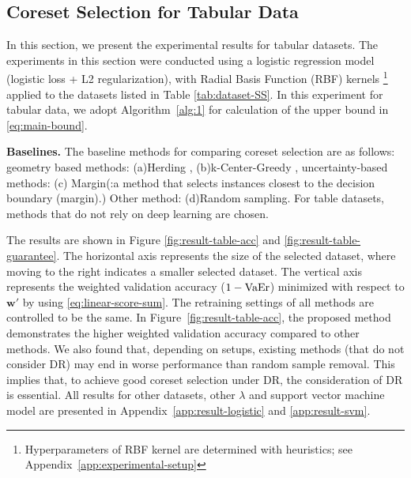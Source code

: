	\subsection{Coreset Selection for Tabular Data}
	\label{subsec:result-table}

	In this section, we present the experimental results for tabular datasets.
	The experiments in this section were conducted using a logistic regression model (logistic loss + L2 regularization), with Radial Basis Function (RBF) kernels
	\footnote{Hyperparameters of RBF kernel are determined with heuristics; see Appendix~\ref{app:experimental-setup}} \citep{scholkopf2001generalized} applied to the datasets listed in Table \ref{tab:dataset-SS}.
	In this experiment for tabular data, we adopt Algorithm~\ref{alg:1} for calculation of the upper bound in \eqref{eq:main-bound}.

	{\bf Baselines.} The baseline methods for comparing coreset selection are as follows:
	geometry based methods: (a)Herding \citep{welling2009herding}, (b)k-Center-Greedy \citep{sener2017active}, uncertainty-based methods: (c) Margin(:a method that selects instances closest to the decision boundary (margin).) Other method: (d)Random sampling.
	For table datasets, methods that do not rely on deep learning are chosen.

	The results are shown in Figure \ref{fig:result-table-acc} and \ref{fig:result-table-guarantee}. The horizontal axis represents the size of the selected dataset, where moving to the right indicates a smaller selected dataset.
	The vertical axis represents the weighted validation accuracy ($1-{\rm VaEr}$) minimized with respect to $\bm w'$ by using \eqref{eq:linear-score-sum}.
	The retraining settings of all methods are controlled to be the same.
	In Figure~\ref{fig:result-table-acc}, the proposed method demonstrates the higher weighted validation accuracy compared to other methods.
	We also found that, depending on setups, existing methods (that do not consider DR) may end in worse performance than random sample removal. This implies that, to achieve good coreset selection under DR, the consideration of DR is essential.
	All results for other datasets, other $\lambda$ and support vector machine model are presented in Appendix~\ref{app:result-logistic} and \ref{app:result-svm}.

